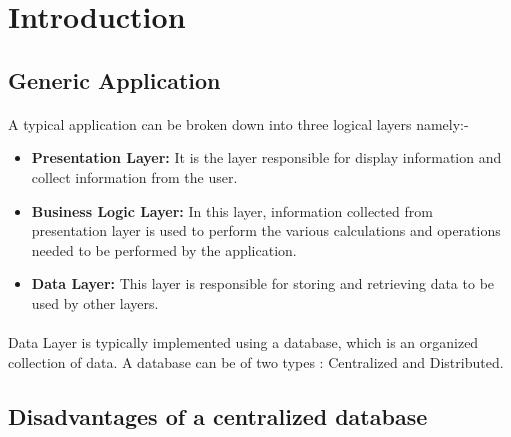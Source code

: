 \documentclass{article}
\begin{document}
\clearpage

\tableofcontents
\clearpage

\section{Introduction}
    \subsection{Generic Application}
        \paragraph{} A typical application can be broken down into three logical layers namely:-
        \begin{itemize}
            \item \textbf{Presentation Layer: }It is the layer responsible for display information and collect information from the user.
            \item \textbf{Business Logic Layer: }In this layer, information collected from presentation layer is used to perform the various calculations and operations needed to be performed by the application.
            \item \textbf{Data Layer: }This layer is responsible for storing and retrieving data to be used by other layers.
        \end{itemize}

        \paragraph{}Data Layer is typically implemented using a database, which is an organized collection of data. A database can be of two types : Centralized and Distributed.
        
    \subsection{Disadvantages of a centralized database}
\end{document}

